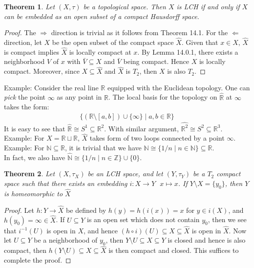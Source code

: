 \documentclass[11pt]{book}
\theoremstyle{break}
\theoremstyle{break}
\newtheorem{thm}{Theorem}[section]
\newcommand{\R}{\mathbb{R}}
\newcommand{\N}{\mathbb{N}}
\newcommand{\Z}{\mathbb{Z}}
\newcommand{\example}{\color{green}Example: \color{black}}
\begin{document}
\newpage
\begin{thm}
Let $(X,\tau)$ be a topological space. Then $X$ is LCH if and only if $X$ can be embedded as an open subset of a compact Hausdorff space.  
\end{thm}
\begin{proof}
The $\Rightarrow$ direction is trivial as it follows from Theorem 14.1. For the $\Leftarrow$ direction, let $X$ be the open subset of the compact space $\hat{X}$. Given that $x \in X$, $\hat{X}$ is compact implies $\hat{X}$ is locally compact at $x$. By Lemma 14.0.1, there exists a neighborhood $V$ of $x$ with $\bar{V} \subseteq X$ and $\bar{V}$ being compact. Hence $X$ is locally compact. Moreover, since $X \subseteq \hat{X}$ and $\hat{X}$ is $T_2$, then $X$ is also $T_2$. 
\end{proof}


\example Consider the real line $\R$ equipped with the Euclidean topology. One can \textit{pick} the point $\infty$ as any point in $\R$. The local basis for the topology on  $\hat{\R}$ at $\infty$ takes the form:
\begin{align*}
\{(\R \setminus [a,b]) \cup \{\infty\} \mid a,b \in \R\}
\end{align*}
It is easy to see that $\hat{\R} \cong S^1 \subseteq \R^2$. With similar argument, $\hat{\R^2} \cong S^2 \subseteq \R^3$.\\

\example For $X = \R \sqcup \R$, $\hat{X}$ takes form of two loops connected by a point $\infty$.\\

\example For $\N\subseteq \R$, it is trivial that we have $\N \cong \{1/n \mid n \in \N \} \subseteq \R$. \\
In fact, we also have $\hat{\N} \cong \{1/n \mid n \in \Z \} \cup \{0\}$. \\

\begin{thm}
Let $(X,\tau_X)$ be an LCH space, and let $(Y,\tau_Y)$ be a $T_2 $ compact space such that there exists an embedding $i:X \to Y \ \ \ x\mapsto x$. If $Y \setminus X = \{y_0\}$, then $Y$ is homeomorphic to $\hat{X}$
\end{thm}
\begin{proof}
Let $h:Y \to \hat{X}$ be defined by $h(y) = h(i(x)) = x$ for $y \in i(X)$, and $h(y_0) = \infty \in \hat{X}$. If $U \subseteq Y$ is an open set which does not contain $y_0$, then we see that $i^{-1}(U)$ is open in $X$, and hence $(h\circ i) (U) \subseteq X \subseteq \hat{X}$ is open in $\hat{X}$. Now let $U \subseteq Y$ be a neighborhood of $y_0$, then $Y\setminus U \subseteq X \subseteq Y$ is closed and hence is also compact, then $h(Y\setminus U) \subseteq X \subseteq \hat{X}$ is then compact and closed. This suffices to complete the proof. 
\end{proof}
\end{document}
